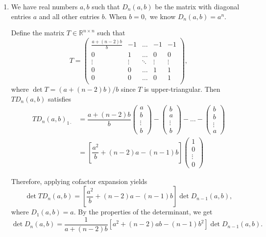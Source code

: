 \documentclass[12pt]{article}
\begin{document}
\begin{enumerate}
  \item[9] We have real numbers $a, b$ such that $D_n(a, b)$ be the
    matrix with diagonal entries $a$ and all other entries $b.$ When
    $b = 0,$ we know $D_{n}(a, b) = a^{n}.$

    Define the matrix $T \in \mathbb R^{n \times n}$ such that
    $$
    T =
    \begin{pmatrix}
      \frac{a + (n-2)b} {b} & -1 & \ldots & -1  & -1 \\
      0 & 1 &  \ldots & 0 & 0 \\
      \vdots & \vdots & \ddots &\vdots  & \vdots \\
      0 & 0 & \ldots & 1 & 1 \\
      0 & 0 & \ldots & 0 & 1 \\
    \end{pmatrix},
    $$
    where $\det T = (a + (n-2)b) / b$ since $T$ is upper-triangular.
    Then $T D_n(a, b)$ satisfies
    \begin{align*}
      TD_{n}(a, b)_{1 \cdot }&= \dfrac{a + (n-2)b}{b}
      \begin{pmatrix}
        a \\
        b \\
        \vdots \\
        b
      \end{pmatrix}  -
      \begin{pmatrix}
        b \\
        a  \\
        \vdots \\
        b
      \end{pmatrix} - \ldots -
      \begin{pmatrix}
        b \\
        b \\
        \vdots \\
        a
      \end{pmatrix} \\
      &= \left[\dfrac{a^2}{b} + (n-2)a - (n-1)b\right]
      \begin{pmatrix}
        1 \\
        0 \\
        \vdots \\
        0
      \end{pmatrix}
    \end{align*}

    Therefore, applying cofactor expansion yields
    $$
    \det T D_{n}(a, b) = \left[\dfrac{a^2}{b} + (n-2)a -
    (n-1)b\right]  \det  D_{n-1}(a, b),
    $$
    where $D_1(a, b) = a.$ By the properties of the determinant, we get
    $$
    \det D_{n}(a, b) = \dfrac{1}{a + (n-2)b} \left[a^2 + (n-2)ab -
    (n-1)b^2\right] \det D_{n-1}(a, b).
    $$


\end{enumerate}
\end{document}
